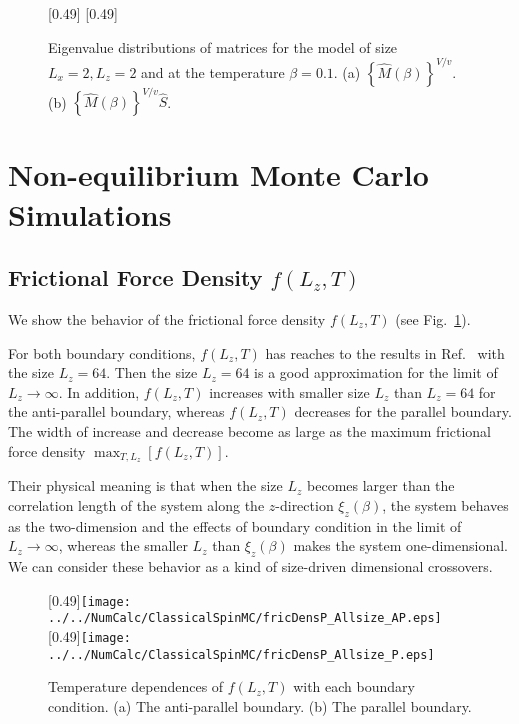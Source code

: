 \begin{figure}[htbp]
	\centering
	\subcaptionbox{\label{fig:EigDistT}}[0.49\linewidth]{\missingfigure[figwidth=0.45\linewidth]{}}
	\subcaptionbox{\label{fig:EigDistM}}[0.49\linewidth]{\missingfigure[figwidth=0.45\linewidth]{}}
	
	\caption{Eigenvalue distributions of matrices for the model of size $L_{x}=2, L_{z}=2$ and at the temperature $\beta=0.1$. (a) $\left\{\hat{M}(\beta)\right\}^{V/v}$. (b) $\left\{\hat{M}(\beta)\right\}^{V/v}\hat{S}$.}
\end{figure}

\section{Non-equilibrium Monte Carlo Simulations}\label{sec:NEMCs}

\subsection{Frictional Force Density $f(L_{z}, T)$}

We show the behavior of the frictional force density $f(L_{z}, T)$ (see Fig.~\ref{fig:fricDens_Allsize}). 

For both boundary conditions, $f(L_{z}, T)$ has reaches to the results in Ref.~\cite{Kadau2008} with the size $L_{z}=64$. Then the size $L_{z}=64$ is a good approximation for the limit of $L_{z}\to\infty$. In addition, $f(L_{z}, T)$ increases with smaller size $L_{z}$ than $L_{z}=64$ for the anti-parallel boundary, whereas $f(L_{z}, T)$ decreases for the parallel boundary. The width of increase and decrease become as large as the maximum frictional force density $\max_{T,L_{z}}\left[f(L_{z}, T)\right]$.

Their physical meaning is that when the size $L_{z}$ becomes larger than the correlation length of the system along the $z$-direction $\xi_{z}(\beta)$, the system behaves as the two-dimension and the effects of boundary condition in the limit of $L_{z}\to\infty$, whereas the smaller $L_{z}$ than $\xi_{z}(\beta)$ makes the system one-dimensional. We can consider these behavior as a kind of size-driven dimensional crossovers. 

\begin{figure}[htbp]
	\centering
	\subcaptionbox{\label{fig:fricDens_Allsize_AP}}[0.49\linewidth]{\texttt{[image: ../../NumCalc/ClassicalSpinMC/fricDensP\_Allsize\_AP.eps]}}
	\subcaptionbox{\label{fig:fricDens_Allsize_P}}[0.49\linewidth]{\texttt{[image: ../../NumCalc/ClassicalSpinMC/fricDensP\_Allsize\_P.eps]}}
	
	\caption{Temperature dependences of $f(L_{z}, T)$ with each boundary condition. (a) The anti-parallel boundary. (b) The parallel boundary.}
	\label{fig:fricDens_Allsize}
\end{figure}

